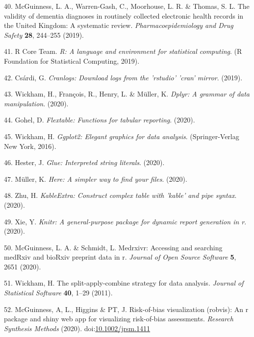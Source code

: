 \documentclass[a4paper, twoside]{templates/ociamthesis}
\begin{document}
\leavevmode\hypertarget{ref-mcguinness2019c}{}%
40. McGuinness, L. A., Warren-Gash, C., Moorhouse, L. R. \& Thomas, S. L. The validity of dementia diagnoses in routinely collected electronic health records in the United Kingdom: A systematic review. \emph{Pharmacoepidemiology and Drug Safety} \textbf{28}, 244--255 (2019).

\leavevmode\hypertarget{ref-base}{}%
41. R Core Team. \emph{R: A language and environment for statistical computing}. (R Foundation for Statistical Computing, 2019).

\leavevmode\hypertarget{ref-cranlogs}{}%
42. Csárdi, G. \emph{Cranlogs: Download logs from the 'rstudio' 'cran' mirror}. (2019).

\leavevmode\hypertarget{ref-dplyr}{}%
43. Wickham, H., François, R., Henry, L. \& Müller, K. \emph{Dplyr: A grammar of data manipulation}. (2020).

\leavevmode\hypertarget{ref-flextable}{}%
44. Gohel, D. \emph{Flextable: Functions for tabular reporting}. (2020).

\leavevmode\hypertarget{ref-ggplot2}{}%
45. Wickham, H. \emph{Ggplot2: Elegant graphics for data analysis}. (Springer-Verlag New York, 2016).

\leavevmode\hypertarget{ref-glue}{}%
46. Hester, J. \emph{Glue: Interpreted string literals}. (2020).

\leavevmode\hypertarget{ref-here}{}%
47. Müller, K. \emph{Here: A simpler way to find your files}. (2020).

\leavevmode\hypertarget{ref-kableExtra}{}%
48. Zhu, H. \emph{KableExtra: Construct complex table with 'kable' and pipe syntax}. (2020).

\leavevmode\hypertarget{ref-knitr}{}%
49. Xie, Y. \emph{Knitr: A general-purpose package for dynamic report generation in r}. (2020).

\leavevmode\hypertarget{ref-medrxivr}{}%
50. McGuinness, L. A. \& Schmidt, L. Medrxivr: Accessing and searching medRxiv and bioRxiv preprint data in r. \emph{Journal of Open Source Software} \textbf{5}, 2651 (2020).

\leavevmode\hypertarget{ref-plyr}{}%
51. Wickham, H. The split-apply-combine strategy for data analysis. \emph{Journal of Statistical Software} \textbf{40}, 1--29 (2011).

\leavevmode\hypertarget{ref-robvis}{}%
52. McGuinness, A, L., Higgins \& PT, J. Risk-of-bias visualization (robvis): An r package and shiny web app for visualizing risk-of-bias assessments. \emph{Research Synthesis Methods} (2020). doi:\href{https://doi.org/10.1002/jrsm.1411}{10.1002/jrsm.1411}
\end{document}
